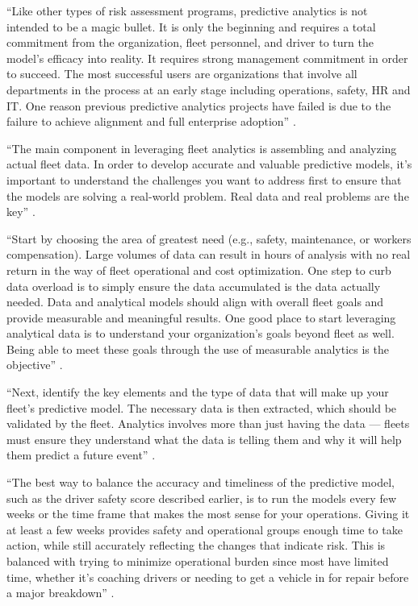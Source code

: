 ``Like other types of risk assessment programs, predictive analytics is not intended to be a magic bullet. It is only the beginning and requires a total commitment from the organization, fleet personnel, and driver to turn the model’s efficacy into reality. It requires strong management commitment in order to succeed. The most successful users are organizations that involve all departments in the process at an early stage including operations, safety, HR and IT. One reason previous predictive analytics projects have failed is due to the failure to achieve alignment and full enterprise adoption'' \cite{Suizo2015decisions}.

``The main component in leveraging fleet analytics is assembling and analyzing actual fleet data. In order to develop accurate and valuable predictive models, it’s important to understand the challenges you want to address first to ensure that the models are solving a real-world problem. Real data and real problems are the key'' \cite{Suizo2015decisions}.

``Start by choosing the area of greatest need (e.g., safety, maintenance, or workers compensation). Large volumes of data can result in hours of analysis with no real return in the way of fleet operational and cost optimization. One step to curb data overload is to simply ensure the data accumulated is the data actually needed. Data and analytical models should align with overall fleet goals and provide measurable and meaningful results. One good place to start leveraging analytical data is to understand your organization’s goals beyond fleet as well. Being able to meet these goals through the use of measurable analytics is the objective'' \cite{Suizo2015decisions}.

``Next, identify the key elements and the type of data that will make up your fleet’s predictive model. The necessary data is then extracted, which should be validated by the fleet. Analytics involves more than just having the data — fleets must ensure they understand what the data is telling them and why it will help them predict a future event'' \cite{Suizo2015decisions}.

``The best way to balance the accuracy and timeliness of the predictive model, such as the driver safety score described earlier, is to run the models every few weeks or the time frame that makes the most sense for your operations. Giving it at least a few weeks provides safety and operational groups enough time to take action, while still accurately reflecting the changes that indicate risk. This is balanced with trying to minimize operational burden since most have limited time, whether it’s coaching drivers or needing to get a vehicle in for repair before a major breakdown'' \cite{Suizo2015decisions}.

